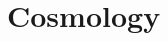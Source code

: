 \documentclass[
    a4paper,                                               %
    oneside,                                               %
    12pt,                                                  %
    headsepline,                                           %
    xcolor=dvipsnames
    ]{scrreprt}
\theoremstyle{definition}
\theoremstyle{remark}
\begin{document}
    	\chapter{Cosmology}
\end{document}
